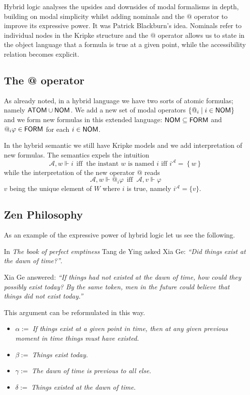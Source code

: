 Hybrid logic analyses the upsides and downsides of modal formalisms in
depth, building on modal simplicity whilst adding nominals and the $@$
operator to improve its expressive power. It was Patrick Blackburn's idea.
Nominals refer to individual nodes in the Kripke structure and the $@$
operator allows us to state in the object language that a formula is true at
a given point, while the accessibility relation becomes explicit.

\subsection{The @ operator}

As already noted, in a hybrid language we have two sorts of atomic formulas;
namely $\textsf{ATOM} \cup \textsf{NOM}$. We add a new set of modal
operators $\{ @_{i}\mid i\in \textsf{NOM}\}$ and we form new
formulas in this extended language: $\textsf{NOM} \subseteq \textsf{FORM}$ 
and $@_{i}\varphi \in \textsf{FORM}$ for each $i\in \textsf{NOM}$.

In the hybrid semantic we still have Kripke models and we add interpretation
of new formulas. The semantics expels the intuition 
$$
\mathcal{A},w\Vdash i~\ \text{iff\ }~\text{the instant }w\text{ is named\ }i%
\text{ iff \ }i^{\mathcal{A}}=\left\{ w\right\}
$$
while the interpretation of the new operator $@$ reads%
$$
\mathcal{A},w\Vdash @_{i}\varphi ~\ \text{iff\ }~\mathcal{A},v\Vdash \varphi
$$
$v$ being the unique element of $W$ where $i$ is true, namely 
$i^{\mathcal{A}}=\{v\}$.

\subsection{Zen Philosophy}

As an example of the expressive power of hybrid logic let us see the
following.

In \emph{The book of perfect emptiness} Tang de Ying asked Xia Ge: 
\emph{``Did things exist at the dawn of time?''}.

Xia Ge answered: \emph{``If things had not existed at the
dawn of time, how could they possibly exist today? By the same token, men in
the future could believe that things did not exist today.''}

This argument can be reformulated in this way.

\begin{itemize}
\item $\alpha :=\;$\emph{If things exist at a given point in time, then at
any given previous moment in time things must have existed.}

\item $\beta :=\;$\emph{Things exist today.}

\item $\gamma :=\;$\emph{The dawn of time is previous to all else.}

\item $\delta :=\;$\emph{Things existed at the dawn of time.}
\end{itemize}

